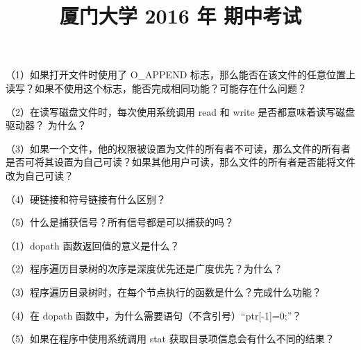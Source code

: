 \documentclass[fontset=exam]{exam-zh}
\title{厦门大学 2016 年 期中考试}
\begin{document}
\maketitle
{}

\par{}\smallskip

（1）如果打开文件时使用了 O\_APPEND 标志，那么能否在该文件的任意位置上读写？如果不使用这个标志，能否完成相同功能？可能存在什么问题？

（2）在读写磁盘文件时，每次使用系统调用 read 和 write 是否都意味着读写磁盘驱动器？ 为什么？

（3）如果一个文件，他的权限被设置为文件的所有者不可读，那么文件的所有者是否可将其设置为自己可读？如果其他用户可读，那么文件的所有者是否能将文件改为自己可读？

（4）硬链接和符号链接有什么区别？

（5）什么是捕获信号？所有信号都是可以捕获的吗？


\par{}\smallskip


\par{}\smallskip

（1）dopath 函数返回值的意义是什么？

（2）程序遍历目录树的次序是深度优先还是广度优先？为什么？

（3）程序遍历目录树时，在每个节点执行的函数是什么？完成什么功能？

（4）在 dopath 函数中，为什么需要语句（不含引号）``ptr{[}-1{]}=0;''？

（5）如果在程序中使用系统调用 stat 获取目录项信息会有什么不同的结果？
\end{document}
